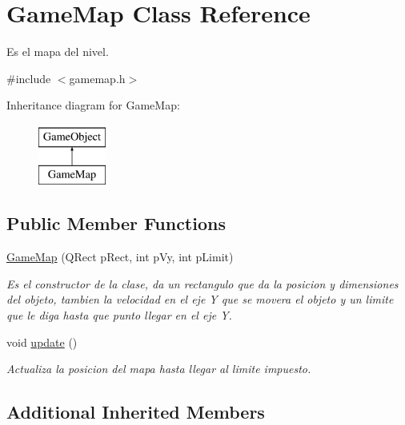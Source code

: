 \hypertarget{class_game_map}{\section{Game\-Map Class Reference}
\label{class_game_map}
}


Es el mapa del nivel.  




{\ttfamily \#include $<$gamemap.\-h$>$}

Inheritance diagram for Game\-Map\-:\begin{figure}[H]
\begin{center}
\leavevmode
\includegraphics[height=2.000000cm]{class_game_map}
\end{center}
\end{figure}
\subsection*{Public Member Functions}
\begin{DoxyCompactItemize}
\item 
\hyperlink{class_game_map_aa62bdfa76f7c48dc6b384870491747c7}{Game\-Map} (Q\-Rect p\-Rect, int p\-Vy, int p\-Limit)
\begin{DoxyCompactList}\small\item\em Es el constructor de la clase, da un rectangulo que da la posicion y dimensiones del objeto, tambien la velocidad en el eje Y que se movera el objeto y un limite que le diga hasta que punto llegar en el eje Y. \end{DoxyCompactList}\item 
\hypertarget{class_game_map_a6497b5f848c5ac2945c0beabb896bead}{void \hyperlink{class_game_map_a6497b5f848c5ac2945c0beabb896bead}{update} ()}\label{class_game_map_a6497b5f848c5ac2945c0beabb896bead}

\begin{DoxyCompactList}\small\item\em Actualiza la posicion del mapa hasta llegar al limite impuesto. \end{DoxyCompactList}\end{DoxyCompactItemize}
\subsection*{Additional Inherited Members}


